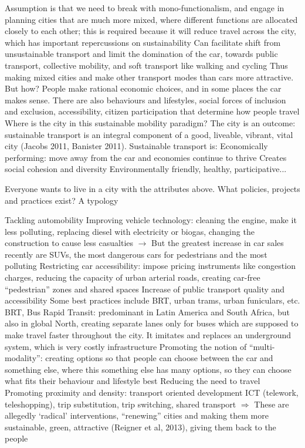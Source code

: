 \documentclass{article}
\begin{document}
\begin{outline}
	\1 Assumption is that we need to break with mono-functionalism, and engage in planning cities that are much more mixed, where different functions are allocated closely to each other; this is required because it will reduce travel across the city, which has important repercussions on sustainability
	\1 Can facilitate shift from unsustainable transport and limit the domination of the car, towards public transport, collective mobility, and soft transport like walking and cycling
	\1 Thus making mixed cities and make other transport modes than cars more attractive. But how?
	\1 People make rational economic choices, and in some places the car makes sense. There are also behaviours and lifestyles, social forces of inclusion and exclusion, accessibility, citizen participation that determine how people travel
	\1 Where is the city in this sustainable mobility paradigm?
		\2 The city is an outcome: sustainable transport is an integral component of a good, liveable, vibrant, vital city (Jacobs 2011, Banister 2011). Sustainable transport is:
		\2 Economically performing: move away from the car and economies continue to thrive
		\2 Creates social cohesion and diversity
		\2 Environmentally friendly, healthy, participative... 
\end{outline}

Everyone wants to live in a city with the attributes above. What policies, projects and practices exist? A typology

\begin{outline}
	\1 Tackling automobility
		\2 Improving vehicle technology: cleaning the engine, make it less polluting, replacing diesel with electricity or biogas, changing the construction to cause less casualties $\rightarrow$ But the greatest increase in car sales recently are SUVs, the most dangerous cars for pedestrians and the most polluting
		\2 Restricting car accessibility: impose pricing instruments like congestion charges, reducing the capacity of urban arterial roads, creating car-free ``pedestrian'' zones and shared spaces
		\2 Increase of public transport quality and accessibility
			\3 Some best practices include BRT, urban trams, urban funiculars, etc.
			\3 BRT, Bus Rapid Transit: predominant in Latin America and South Africa, but also in global North, creating separate lanes only for buses which are supposed to make travel faster throughout the city. It imitates and replaces an underground system, which is very costly infrastructure
		\2  Promoting the notion of ``multi-modality'': creating options so that people can choose between the car and something else, where this something else has many options, so they can choose what fits their behaviour and lifestyle best
	\1 Reducing the need to travel
		\2 Promoting proximity and density: transport oriented development
		\2 ICT (telework, teleshopping), trip substitution, trip switching, shared transport
		\2 $\Rightarrow$ These are allegedly `radical' interventions, ``renewing'' cities and making them more sustainable, green, attractive (Reigner et al, 2013), giving them back to the people
\end{outline}
\end{document}
